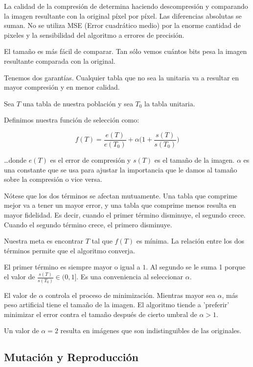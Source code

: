 La calidad de la compresión de determina haciendo descompresión y comparando la
imagen resultante con la original píxel por píxel. Las diferencias absolutas se
suman. No se utiliza MSE (Error cuadrático medio) por la enorme cantidad de
pixeles y la sensibilidad del algoritmo a errores de precisión.

El tamaño es más fácil de comparar. Tan sólo vemos cuántos bits pesa la imagen
resultante comparada con la original.

Tenemos dos garantías. Cualquier tabla que no sea la unitaria va a resultar en
mayor compresión y en menor calidad.

Sea $T$ una tabla de nuestra población y sea $T_0$ la tabla unitaria.

Definimos nuestra función de selección como:

\begin{equation}
f(T) = \frac{e(T)}{e(T_0)} + \alpha \Big(1 + \frac{s(T)}{s(T_0)}\Big)
\end{equation}\label{eq:fitness}

\dots donde $e(T)$ es el error de compresión y $s(T)$ es el tamaño de la
imagen. $\alpha$ es una constante que se usa para ajustar la importancia que le
damos al tamaño sobre la compresión o vice versa.

Nótese que los dos términos se afectan mutuamente. Una tabla que comprime mejor
va a tener un mayor error, y una tabla que comprime menos resulta en mayor
fidelidad. Es decir, cuando el primer término disminuye, el segundo crece.
Cuando el segundo término crece, el primero disminuye.

Nuestra meta es encontrar $T$ tal que $f(T)$ es mínima. La relación entre los
dos términos permite que el algoritmo converja.

El primer término es siempre mayor o igual a $1$. Al segundo se le suma 1
porque el valor de $\frac{s(T)}{s(T_0)} \in (0, 1]$. Es una conveniencia al
seleccionar $\alpha$.

El valor de $\alpha$ controla el proceso de minimización. Mientras mayor sea
$\alpha$, más peso artificial tiene el tamaño de la imagen. El algoritmo tiende
a 'preferir' minimizar el error contra el tamaño después de cierto umbral de
$\alpha > 1$.

Un valor de $\alpha = 2$ resulta en imágenes que son indistinguibles de las originales.

\subsection {Mutación y Reproducción}

